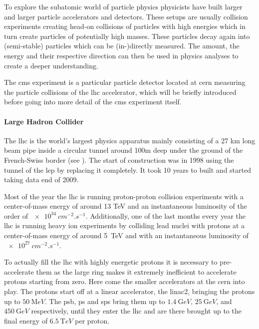 \label{sssec:detector}

To explore the subatomic world of particle physics physicists have built larger and larger particle accelerators and detectors. These setups are usually collision experiments creating head-on collisions of particles with high energies which in turn create particles of potentially high masses. These particles decay again into (semi-stable) particles which can be (in-)directly measured. The amount, the energy and their respective direction can then be used in physics analyses to create a deeper understanding. %

The \gls{cms} experiment is a particular particle detector located at \gls{cern} measuring the particle collisions of the \gls{lhc} accelerator, which will be briefly introduced before going into more detail of the \gls{cms} experiment itself.

\paragraph{Large Hadron Collider}

The \gls{lhc} is the world's largest physics apparatus mainly consisting of a 27 km long beam pipe inside a circular tunnel around 100m deep under the ground of the French-Swiss border (see ). The start of construction was in 1998 using the tunnel of the \gls{lep} by replacing it completely. It took 10 years to built and started taking data end of 2009.

Most of the year the \gls{lhc} is running proton-proton collision experiments with a center-of-mass energy of around 13 TeV and an
instantaneous luminosity of the order of \(\SI{e34}{cm^{-2}.s^{-1}}\). Additionally, one of the last months every year the \gls{lhc} is running heavy ion experiments by colliding lead nuclei with protons at a center-of-mass energy of around \SI{5}{\tera eV} and with an instantaneous luminosity of \(\SI{e27}{cm^{-2}.s^{-1}}\).

To actually fill the \gls{lhc} with highly energetic protons it is necessary to pre-accelerate them as the large ring makes it extremely inefficient to accelerate protons starting from zero. Here come the smaller accelerators at the \gls{cern} into play. The protons start off at a linear accelerator, the \gls{linac2}, bringing the protons up to \(\SI{50}{\mega eV}\). The \gls{psb}, \gls{ps} and \gls{sps} bring them up to \(\SI{1.4}{\giga eV}\), \(\SI{25}{\giga eV}\), and \(\SI{450}{\giga eV}\) respectively, until they enter the \gls{lhc} and are there brought up to the final energy of \(\SI{6.5}{\tera eV}\) per proton.

